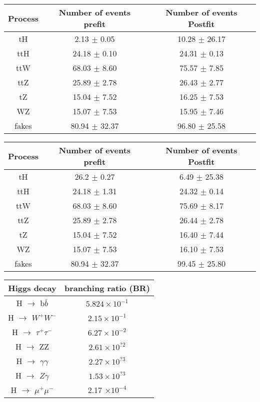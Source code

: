 \documentclass[10pt,a4paper]{article}
\begin{document}
	
	\begin{tabular}{|c|c|c|}
		\hline
	Process  & Number of events prefit    & Number of events Postfit \\
	\hline
	tH & 2.13 $\pm$ 0.05  & 10.28 $\pm$ 26.17\\
	\hline
	ttH  &  24.18 $\pm$ 0.10 & 24.31 $\pm$ 0.13 \\
	\hline
	ttW  &  68.03 $\pm$ 8.60 & 75.57 $\pm$ 7.85\\
	\hline
	ttZ  & 25.89 $\pm$ 2.78 & 26.43 $\pm$ 2.77\\
	\hline
	tZ & 15.04 $\pm$ 7.52 & 16.25 $\pm$ 7.53\\
	\hline
	WZ & 15.07 $\pm$ 7.53 & 15.95 $\pm$ 7.46\\
	\hline
	fakes  & 80.94 $\pm$ 32.37  & 96.80 $\pm$ 25.58\\
	\hline
	\end{tabular}	

	
	\begin{tabular}{|c|c|c|}
	\hline
	Process  & Number of events prefit    & Number of events Postfit \\
\hline
tH & 26.2 $\pm$ 0.27 & 6.49 $\pm$ 25.38\\
\hline
ttH  & 24.18 $\pm$ 1.31& 24.32 $\pm$ 0.14\\
\hline
ttW  & 68.03  $\pm$ 8.60 & 75.69 $\pm$ 8.17\\
\hline
ttZ  & 25.89  $\pm$  2.78& 26.44 $\pm$ 2.78\\
\hline
tZ & 15.04  $\pm$ 7.52 & 16.40 $\pm$ 7.44\\
\hline
WZ & 15.07  $\pm$ 7.53& 16.10 $\pm$ 7.53\\
\hline
fakes  & 80.94   $\pm$ 32.37& 99.45 $\pm$ 25.80\\
\hline
	\end{tabular}	


\begin{tabular}{|c|c|}
	\hline
	Higgs decay &
	branching ratio (BR)\\
	\hline
	H $\rightarrow$ b$\bar{b}$ &
	$5.824\times 10^{-1}$ \\
	\hline
	H $\rightarrow$ $W^+W^-$ &
	$2.15\times10^{-1}$ \\
	\hline
	H $\rightarrow$ $\tau^+\tau^-$ &
	$6.27\times10^{-2}$\\
	\hline

	H $\rightarrow$ ZZ &
	$2.61\times10^{?2}$\\
	\hline
	H $\rightarrow$ $\gamma\gamma$ &
	$2.27\times 10^{?3}$\\
	\hline
	H $\rightarrow$ $Z\gamma$ &
	$1.53\times 10^{?3}$\\
	\hline
	H $\rightarrow$ $\mu^+\mu^-$ &
	2.17 $\times 10^{-4}$\\
	\hline
\end{tabular}
\end{document}

